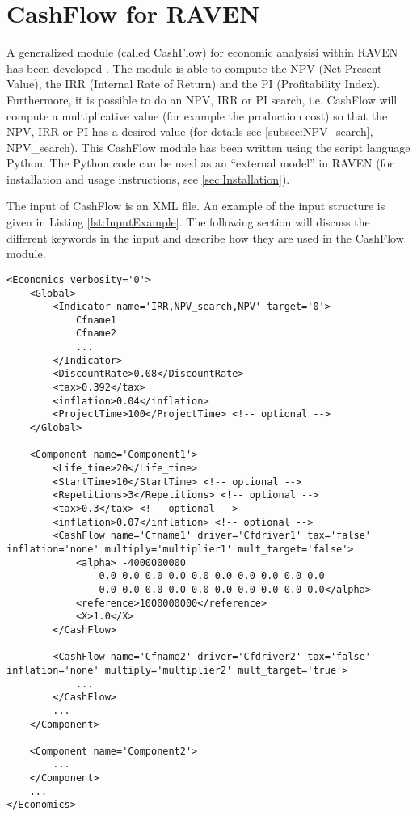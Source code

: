 \section{CashFlow for RAVEN}
A generalized module (called CashFlow) for economic analysisi within RAVEN has been developed \cite{MSApril2017}. The module is able to compute 
the NPV (Net Present Value), the IRR (Internal Rate of Return) and the PI (Profitability Index). Furthermore, it is possible to 
do an NPV, IRR or PI search, i.e. CashFlow will compute a multiplicative value (for example the production cost) so that the 
NPV, IRR or PI has a desired value (for details see \ref{subsec:NPV_search}, NPV\_search). This CashFlow module has been written using the script language Python. 
The Python code can be used as an “external model” in RAVEN (for installation and usage instructions, see \ref{sec:Installation}).

The input of CashFlow is an XML file. An example of the input structure is given in Listing \ref{lst:InputExample}. The following section will discuss the
 different keywords in the input and describe how they are used in the CashFlow module.

\begin{lstlisting}[style=XML,morekeywords={anAttribute},caption=Economics input example., label=lst:InputExample]
<Economics verbosity='0'>
    <Global>
        <Indicator name='IRR,NPV_search,NPV' target='0'>
            Cfname1
            Cfname2
            ...
        </Indicator>
        <DiscountRate>0.08</DiscountRate>
        <tax>0.392</tax>
        <inflation>0.04</inflation>
        <ProjectTime>100</ProjectTime> <!-- optional -->
    </Global>

    <Component name='Component1'>
        <Life_time>20</Life_time>
        <StartTime>10</StartTime> <!-- optional -->
        <Repetitions>3</Repetitions> <!-- optional -->
        <tax>0.3</tax> <!-- optional -->
        <inflation>0.07</inflation> <!-- optional -->
        <CashFlow name='Cfname1' driver='Cfdriver1' tax='false' inflation='none' multiply='multiplier1' mult_target='false'>
            <alpha> -4000000000
                0.0 0.0 0.0 0.0 0.0 0.0 0.0 0.0 0.0 0.0
                0.0 0.0 0.0 0.0 0.0 0.0 0.0 0.0 0.0 0.0</alpha>
            <reference>1000000000</reference>
            <X>1.0</X>
        </CashFlow>

        <CashFlow name='Cfname2' driver='Cfdriver2' tax='false' inflation='none' multiply='multiplier2' mult_target='true'>
            ...
        </CashFlow>
        ...
    </Component>

    <Component name='Component2'>
        ...
    </Component>
    ...
</Economics>
\end{lstlisting}

